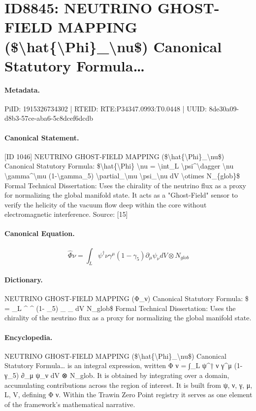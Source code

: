 \section*{ID8845: NEUTRINO GHOST-FIELD MAPPING (\$\textbackslash{}hat\{\textbackslash{}Phi\}\_\textbackslash{}nu\$) Canonical Statutory Formula…}
\paragraph{Metadata.}
PiID: 1915326734302 | RTEID: RTE:P34347.0993:T0.0448 | UUID: 8de30a09-d8b3-57ce-aba6-5c8dcef6dcdb

\paragraph{Canonical Statement.}
[ID 1046] NEUTRINO GHOST-FIELD MAPPING (\$\textbackslash{}hat\{\textbackslash{}Phi\}\_\textbackslash{}nu\$) Canonical Statutory Formula: \$\textbackslash{}hat\{\textbackslash{}Phi\} \textbackslash{}nu = \textbackslash{}int\_L \textbackslash{}psi\textasciicircum{}\textbackslash{}dagger \textbackslash{}nu \textbackslash{}gamma\textasciicircum{}\textbackslash{}mu (1-\textbackslash{}gamma\_5) \textbackslash{}partial\_\textbackslash{}mu \textbackslash{}psi\_\textbackslash{}nu dV \textbackslash{}otimes N\_\{glob\}\$ Formal Technical Dissertation: Uses the chirality of the neutrino flux as a proxy for normalizing the global manifold state. It acts as a "Ghost-Field" sensor to verify the helicity of the vacuum flow deep within the core without electromagnetic interference. Source: [15]

\paragraph{Canonical Equation.}
\[
\hat{\Phi} \nu = \int_L \psi^\dagger \nu \gamma^\mu (1-\gamma_5) \partial_\mu \psi_\nu dV \otimes N_{glob}
\]

\paragraph{Dictionary.}
NEUTRINO GHOST-FIELD MAPPING (Φ\_ν) Canonical Statutory Formula: \$ = \_L \textasciicircum{} \textasciicircum{} (1- \_5) \_ \_ dV N\_glob\$ Formal Technical Dissertation: Uses the chirality of the neutrino flux as a proxy for normalizing the global manifold state.

\paragraph{Encyclopedia.}
NEUTRINO GHOST-FIELD MAPPING (\$\textbackslash{}hat\{\textbackslash{}Phi\}\_\textbackslash{}nu\$) Canonical Statutory Formula… is an integral expression, written Φ ν = ∫\_L ψ\textasciicircum{}† ν γ\textasciicircum{}μ (1-γ\_5) ∂\_μ ψ\_ν dV ⊗ N\_glob. It is obtained by integrating over a domain, accumulating contributions across the region of interest. It is built from ψ, ν, γ, μ, L, V, defining Φ ν. Within the Trawin Zero Point registry it serves as one element of the framework's mathematical narrative.
